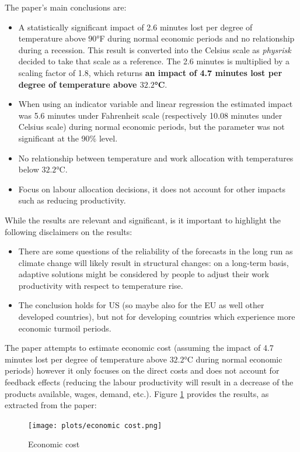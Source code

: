 \documentclass[a4paper,11pt]{extarticle} %
\theoremstyle{definition}
\begin{document}
The paper's main conclusions are:
\begin{itemize}
    \item A statistically significant impact of 2.6 minutes lost per degree of temperature above $90$°F during normal economic periods and no relationship during a recession. This result is converted into the Celsius scale as \emph{physrisk} decided to take that scale as a reference. The 2.6 minutes is multiplied by a scaling factor of 1.8, which returns \textbf{an impact of 4.7 minutes lost per degree of temperature above $\mathbf{32.2}$°C}.
    \item When using an indicator variable and linear regression the estimated impact was 5.6 minutes under Fahrenheit scale (respectively 10.08 minutes under Celsius scale) during normal economic periods, but the parameter was not significant at the 90\% level.
    \item No relationship between temperature and work allocation with temperatures below  $32.2$°C.
    \item Focus on labour allocation decisions, it does not account for other impacts such as reducing productivity.
\end{itemize}
While the results are relevant and significant, is it important to highlight the following disclaimers on the results:
\begin{itemize}
    \item There are some questions of the reliability of the forecasts in the long run as climate change will likely result in structural changes: on a long-term basis, adaptive solutions might be considered by people to adjust their work productivity with respect to temperature rise.
    \item The conclusion holds for US (so maybe also for the EU as well other developed countries), but not for developing countries which experience more economic turmoil periods.
\end{itemize}
The paper attempts to estimate economic cost (assuming the impact of 4.7 minutes lost per degree of temperature above $32.2$°C during normal economic periods) however it only focuses on the direct costs and does not account for feedback effects (reducing the labour productivity will result in a decrease of the products available, wages, demand, etc.). Figure \ref{fig:economiccost} provides the results, as extracted from the paper:
\begin{figure}[h]
    \centering
    \texttt{[image: plots/economic cost.png]}
    \caption{Economic cost}
    \label{fig:economiccost}
\end{figure}
\end{document}
